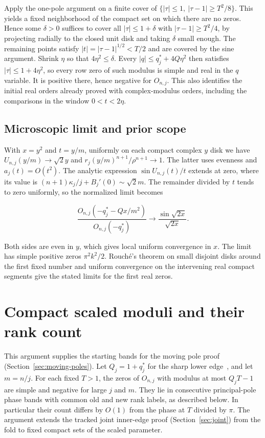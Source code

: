 \documentclass[11pt]{article}
\begin{document}
Apply the one-pole argument on a finite cover of \(\{|\tau|\le1,\ |\tau-1|\ge T^2/8\}\). This yields a fixed neighborhood of the compact set on which there are no zeros. Hence some \(\delta>0\) suffices to cover all \(|\tau|\le1+\delta\) with \(|\tau-1|\ge T^2/4\), by projecting radially to the closed unit disk and taking \(\delta\) small enough. The remaining points satisfy \(|t|=|\tau-1|^{1/2}<T/2\) and are covered by the sine argument. Shrink \(\eta\) so that \(4\eta^2\le\delta\). Every \(|q|\le q_j^*+4Q\eta^2\) then satisfies \(|\tau|\le1+4\eta^2\), so every row zero of such modulus is simple and real in the \(q\) variable. It is positive there, hence negative for \(O_{n,j}\). This also identifies the initial real orders already proved with complex-modulus orders, including the comparisons in the window \(0<t<2\eta\).

\subsection{Microscopic limit and prior scope}
\label{sec:microscopic-limit-and-prior-scope}

With \(x=y^2\) and \(t=y/m\), uniformly on each compact complex \(y\) disk we have \(U_{n,j}(y/m)\to\sqrt2 y\) and \(r_j(y/m)^{n+1}/\rho^{n+1}\to1\). The latter uses evenness and \(a_j(t)=O(t^2)\). The analytic expression \(\sin U_{n,j}(t)/t\) extends at zero, where its value is \((n+1)\kappa_j/j+B_j'(0)\sim\sqrt2 m\). The remainder divided by \(t\) tends to zero uniformly, so the normalized limit becomes

\begin{equation*}
\frac{O_{n,j}(-q_j^{\ast}-Qx/m^2)}{O_{n,j}(-q_j^{\ast})}
\longrightarrow \frac{\sin\sqrt{2x}}{\sqrt{2x}}.
\end{equation*}

Both sides are even in \(y\), which gives local uniform convergence in \(x\). The limit has simple positive zeros \(\pi^2k^2/2\). Rouché's theorem on small disjoint disks around the first fixed number and uniform convergence on the intervening real compact segments give the stated limits for the first real zeros.

\section{Compact scaled moduli and their rank count}
\label{sec:compact-start}

This argument supplies the starting bands for the moving pole proof (Section~\ref{sec:moving-poles}). Let \(Q_j=1+q_j^*\) for the sharp lower edge~\cite{edge}, and let \(m=n/j\). For each fixed \(T>1\), the zeros of \(O_{n,j}\) with modulus at most \(Q_jT-1\) are simple and negative for large \(j\) and \(m\). They lie in consecutive principal-pole phase bands with common old and new rank labels, as described below. In particular their count differs by \(O(1)\) from the phase at \(T\) divided by \(\pi\). The argument extends the tracked joint inner-edge proof (Section~\ref{sec:joint}) from the fold to fixed compact sets of the scaled parameter.
\end{document}
